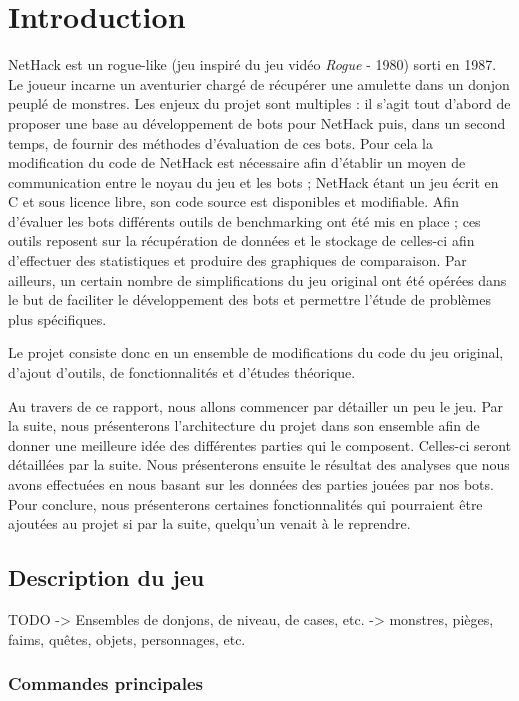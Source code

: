 \documentclass[a4paper,12pt]{article}
\begin{document}
\tableofcontents
\pagebreak

\section{Introduction}

NetHack est un rogue-like (jeu inspiré du jeu vidéo \emph{Rogue} - 1980)
sorti en 1987. Le joueur incarne un aventurier chargé de récupérer une
amulette dans un donjon peuplé de monstres.
Les enjeux du projet sont multiples : il s'agit tout d'abord de proposer une
base au développement de bots pour NetHack puis, dans un second temps, de
fournir des méthodes d'évaluation de ces bots. Pour cela la modification du code
de NetHack est nécessaire afin d'établir un moyen de communication entre le
noyau du jeu et les bots ; NetHack étant un jeu écrit en C et sous licence
libre, son code source est disponibles et modifiable. Afin d'évaluer les bots
différents outils de benchmarking ont été mis en place ; ces outils reposent
sur la récupération de données et le stockage de celles-ci afin d'effectuer
des statistiques et produire des graphiques de comparaison.
Par ailleurs, un certain nombre de simplifications du jeu original ont été
opérées dans le but de faciliter le développement des bots et permettre
l'étude de problèmes plus spécifiques.  

Le projet consiste donc en un ensemble de modifications du code du jeu
original, d'ajout d'outils, de fonctionnalités et d'études théorique.

Au travers de ce rapport, nous allons commencer par détailler un peu le jeu.
Par la suite, nous présenterons l'architecture du projet dans son ensemble afin
de donner une meilleure idée des différentes parties qui le composent. Celles-ci
seront détaillées par la suite. Nous présenterons ensuite le résultat des
analyses que nous avons effectuées en nous basant sur les données des parties
jouées par nos bots. Pour conclure, nous présenterons certaines fonctionnalités
qui pourraient être ajoutées au projet si par la suite, quelqu'un venait à le
reprendre.

\subsection*{Description du jeu}
TODO
-> Ensembles de donjons, de niveau, de cases, etc.
-> monstres, pièges, faims, quêtes, objets, personnages, etc.

\subsubsection*{Commandes principales}
\end{document}
